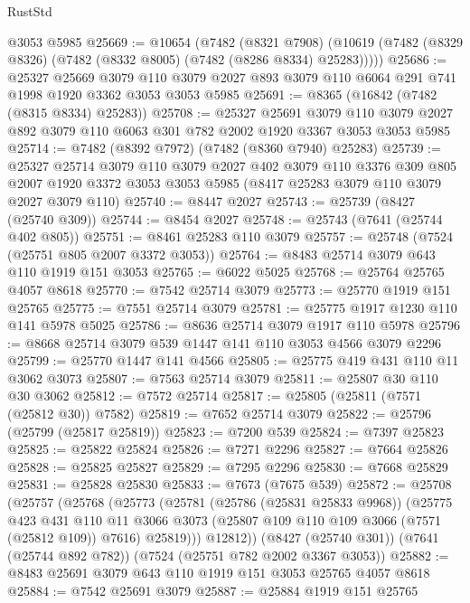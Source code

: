 \begin{lexlean}{RustStd}
\begin{coremodule}
    @3053
    @5985
@25669 := @10654
    (@7482
      (@8321 @7908)
      (@10619 (@7482 (@8329 @8326) (@7482 (@8332 @8005) (@7482 (@8286 @8334) @25283)))))
@25686 := @25327
    @25669
    @3079
    @110
    @3079
    @2027
    @893
    @3079
    @110
    @6064
    @291
    @741
    @1998
    @1920
    @3362
    @3053
    @3053
    @5985
@25691 := @8365 (@16842 (@7482 (@8315 @8334) @25283))
@25708 := @25327
    @25691
    @3079
    @110
    @3079
    @2027
    @892
    @3079
    @110
    @6063
    @301
    @782
    @2002
    @1920
    @3367
    @3053
    @3053
    @5985
@25714 := @7482 (@8392 @7972) (@7482 (@8360 @7940) @25283)
@25739 := @25327
    @25714
    @3079
    @110
    @3079
    @2027
    @402
    @3079
    @110
    @3376
    @309
    @805
    @2007
    @1920
    @3372
    @3053
    @3053
    @5985
    (@8417 @25283 @3079 @110 @3079 @2027 @3079 @110)
@25740 := @8447 @2027
@25743 := @25739 (@8427 (@25740 @309))
@25744 := @8454 @2027
@25748 := @25743 (@7641 (@25744 @402 @805))
@25751 := @8461 @25283 @110 @3079
@25757 := @25748 (@7524 (@25751 @805 @2007 @3372 @3053))
@25764 := @8483 @25714 @3079 @643 @110 @1919 @151 @3053
@25765 := @6022 @5025
@25768 := @25764 @25765 @4057 @8618
@25770 := @7542 @25714 @3079
@25773 := @25770 @1919 @151 @25765
@25775 := @7551 @25714 @3079
@25781 := @25775 @1917 @1230 @110 @141 @5978 @5025
@25786 := @8636 @25714 @3079 @1917 @110 @5978
@25796 := @8668 @25714 @3079 @539 @1447 @141 @110 @3053 @4566 @3079 @2296
@25799 := @25770 @1447 @141 @4566
@25805 := @25775 @419 @431 @110 @11 @3062 @3073
@25807 := @7563 @25714 @3079
@25811 := @25807 @30 @110 @30 @3062
@25812 := @7572 @25714
@25817 := @25805 (@25811 (@7571 (@25812 @30)) @7582)
@25819 := @7652 @25714 @3079
@25822 := @25796 (@25799 (@25817 @25819))
@25823 := @7200 @539
@25824 := @7397 @25823
@25825 := @25822 @25824
@25826 := @7271 @2296
@25827 := @7664 @25826
@25828 := @25825 @25827
@25829 := @7295 @2296
@25830 := @7668 @25829
@25831 := @25828 @25830
@25833 := @7673 (@7675 @539)
@25872 := @25708
    (@25757
      (@25768
        (@25773
          (@25781
            (@25786 (@25831 @25833 @9968))
            (@25775
              @423
              @431
              @110
              @11
              @3066
              @3073
              (@25807 @109 @110 @109 @3066 (@7571 (@25812 @109)) @7616)
              @25819)))
        @12812))
    (@8427 (@25740 @301))
    (@7641 (@25744 @892 @782))
    (@7524 (@25751 @782 @2002 @3367 @3053))
@25882 := @8483 @25691 @3079 @643 @110 @1919 @151 @3053 @25765 @4057 @8618
@25884 := @7542 @25691 @3079
@25887 := @25884 @1919 @151 @25765

\end{coremodule}
\end{lexlean}
